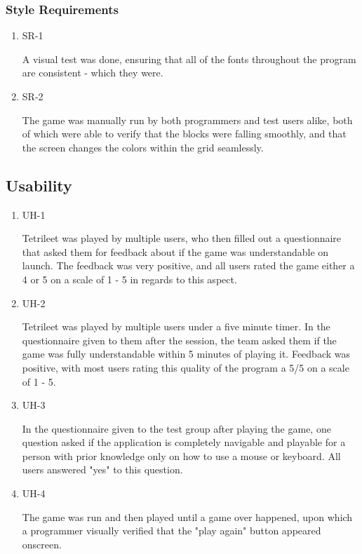 \documentclass[12pt, titlepage]{article}
\begin{document}
\subsubsection{Style Requirements}

\begin{enumerate}

\item{SR-1\\}

A visual test was done, ensuring that all of the fonts throughout the program are consistent - which they were. 

\item{SR-2\\}

The game was manually run by both programmers and test users alike, both of which were able to verify that the blocks were falling smoothly, and that the screen changes the colors within the grid seamlessly.
\end{enumerate}

\subsection{Usability}
\begin{enumerate}

\item{UH-1\\}

Tetrileet was played by multiple users, who then filled out a questionnaire that asked them for feedback about if the game was understandable on launch. The feedback was very positive, and all users rated the game either a 4 or 5 on a scale of 1 - 5 in regards to this aspect.

\item{UH-2\\}

Tetrileet was played by multiple users under a five minute timer. In the questionnaire given to them after the session, the team asked them if the game was fully understandable within 5 minutes of playing it. Feedback was positive, with most users rating this quality of the program a 5/5 on a scale of 1 - 5.

\item{UH-3\\}

In the questionnaire given to the test group after playing the game, one question asked if the application is completely navigable and playable for a person with prior knowledge only on how to use a mouse or keyboard. All users answered "yes" to this question.

\item{UH-4\\}

The game was run and then played until a game over happened, upon which a programmer visually verified that the "play again" button appeared onscreen.

\end{enumerate}
\end{document}
